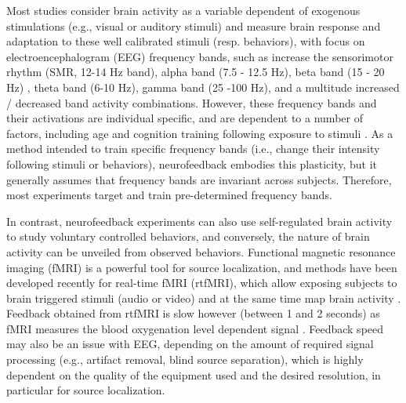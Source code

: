 Most studies consider brain activity as a variable dependent of exogenous stimulations  (e.g., visual or auditory stimuli) and measure brain response and adaptation to these well calibrated stimuli (resp. behaviors), with focus on electroencephalogram (EEG) frequency bands, such as increase the sensorimotor rhythm (SMR, 12-14 Hz band), alpha band (7.5 - 12.5 Hz), beta band (15 - 20 Hz) , theta band (6-10 Hz), gamma band (25 -100 Hz), and a multitude increased / decreased band activity combinations. However, these frequency bands and their activations are individual specific, and are dependent to a number of factors, including age \cite{} and cognition training following exposure to stimuli \cite{}. As a method intended to train specific frequency bands (i.e., change their intensity following stimuli or behaviors), neurofeedback embodies this plasticity, but it generally assumes that frequency bands are invariant across subjects. Therefore, most experiments target and train pre-determined frequency bands. 

In contrast, neurofeedback experiments can also use self-regulated brain activity to study voluntary controlled behaviors, and conversely, the nature of brain activity can be unveiled from observed behaviors. Functional magnetic resonance imaging (fMRI) is a powerful tool for source localization, and methods have been developed recently for real-time fMRI (rtfMRI), which allow exposing subjects to brain triggered stimuli (audio or video) and at the same time map brain activity \cite{}. Feedback obtained from rtfMRI is slow however (between 1 and 2 seconds) as fMRI measures the blood oxygenation level dependent signal \cite{ogawa1990brain,ogawa1990oxygenation}. Feedback speed may also be an issue with EEG, depending on the amount of required signal processing (e.g., artifact removal, blind source separation), which is highly dependent on the quality of the equipment used and the desired resolution, in particular for source localization.


